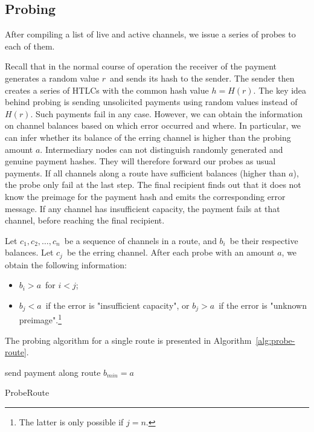 \subsection{Probing}

After compiling a list of live and active channels, we issue a series of probes to each of them.

Recall that in the normal course of operation the receiver of the payment generates a random value $r$~and sends its hash to the sender.
The sender then creates a series of HTLCs with the common hash value $h = H(r)$.
The key idea behind probing is sending unsolicited payments using random values instead of $H(r)$.
Such payments fail in any case.
However, we can obtain the information on channel balances based on which error occurred and where.
In particular, we can infer whether its balance of the erring channel is higher than the probing amount $a$.
Intermediary nodes can not distinguish randomly generated and genuine payment hashes.
They will therefore forward our probes as usual payments.
If all channels along a route have sufficient balances (higher than $a$), the probe only fail at the last step.
The final recipient finds out that it does not know the preimage for the payment hash and emits the corresponding error message.
If any channel has insufficient capacity, the payment fails at that channel, before reaching the final recipient.

Let $c_1, c_2, \dots, c_n$~be a sequence of channels in a route, and $b_i$~be their respective balances.
Let $c_j$~be the erring channel.
After each probe with an amount $a$, we obtain the following information:
\begin{itemize}
	\item $b_i > a$~for $i<j$;
	\item $b_j < a$~if the error is "insufficient capacity", or $b_j > a$~if the error is "unknown preimage".\footnote{The latter is only possible if $j=n$.}
\end{itemize}

The probing algorithm for a single route is presented in Algorithm~\ref{alg:probe-route}.

\begin{algorithm}
	send payment along route\;
	 {
		$b_{min} = a$\;
	}
	\caption{ProbeRoute}
	\label{alg:probe-route}
\end{algorithm}


